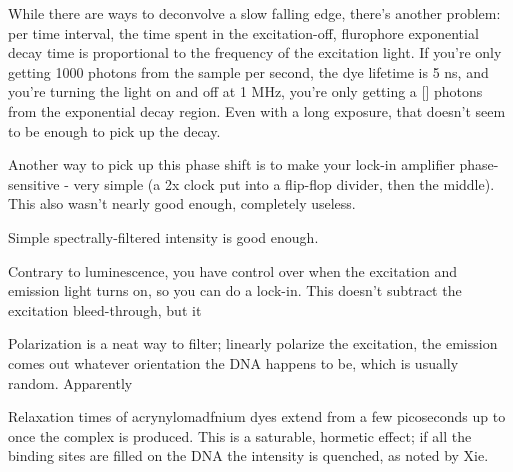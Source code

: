 \documentclass[paper.tex]{subfiles}
\begin{document}
While there are ways to deconvolve a slow falling edge, there’s another problem: per time interval, the time spent in the excitation-off, flurophore exponential decay time is proportional to the frequency of the excitation light. If you’re only getting 1000 photons from the sample per second, the dye lifetime is 5 ns, and you’re turning the light on and off at 1 MHz, you’re only getting a [] photons from the exponential decay region. Even with a long exposure, that doesn’t seem to be enough to pick up the decay. 

Another way to pick up this phase shift is to make your lock-in amplifier phase-sensitive - very simple (a 2x clock put into a flip-flop divider, then the middle). This also wasn’t nearly good enough, completely useless. 

Simple spectrally-filtered intensity is good enough.

Contrary to luminescence, you have control over when the excitation and emission light turns on, so you can do a lock-in. This doesn’t subtract the excitation bleed-through, but it 

Polarization is a neat way to filter; linearly polarize the excitation, the emission comes out whatever orientation the DNA happens to be, which is usually random. Apparently

Relaxation times of acrynylomadfnium dyes extend from a few picoseconds up to once the complex is produced. This is a saturable, hormetic effect; if all the binding sites are filled on the DNA the intensity is quenched, as noted by Xie. 
\end{document}
